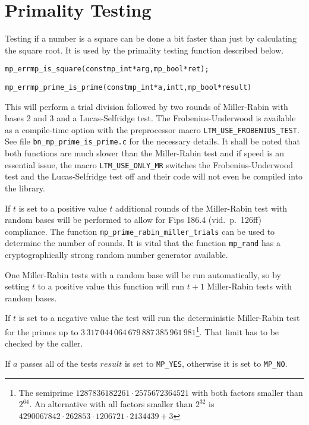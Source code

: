 \documentclass[synpaper]{book}
\begin{document}
\section{Primality Testing}
Testing if a number is a square can be done a bit faster than just by calculating the square root. It is used by the primality testing function described below.
\begin{alltt}
mp_err mp_is_square(const mp_int *arg, mp_bool *ret);
\end{alltt}


\begin{alltt}
mp_err mp_prime_is_prime(const mp_int *a, int t, mp_bool *result)
\end{alltt}
This will perform a trial division followed by two rounds of Miller-Rabin with bases 2 and 3 and a Lucas-Selfridge test. The Frobenius-Underwood is available as a compile-time option with the preprocessor macro \texttt{LTM\_USE\_FROBENIUS\_TEST}. See file
\texttt{bn\_mp\_prime\_is\_prime.c} for the necessary details. It shall be noted that both functions are much slower than
the Miller-Rabin test and if speed is an essential issue, the macro \texttt{LTM\_USE\_ONLY\_MR} switches the Frobenius-Underwood test and the Lucas-Selfridge test off and their code will not even be compiled into the library.

If $t$ is set to a positive value $t$ additional rounds of the Miller-Rabin test with random bases will be performed to allow for Fips 186.4 (vid.~p.~126ff) compliance. The function \texttt{mp\_prime\_rabin\_miller\_trials} can be used to determine the number of rounds. It is vital that the function \texttt{mp\_rand} has a cryptographically strong random number generator available.

One Miller-Rabin tests with a random base will be run automatically, so by setting $t$ to a positive value this function will run $t + 1$ Miller-Rabin tests with random bases.

If  $t$ is set to a negative value the test will run the deterministic Miller-Rabin test for the primes up to $3\,317\,044\,064\,679\,887\,385\,961\,981$\footnote{The semiprime $1287836182261\cdot 2575672364521$ with both factors smaller than $2^64$. An alternative with all factors smaller than $2^32$ is $4290067842\cdot 262853\cdot 1206721\cdot 2134439 + 3$}. That limit has to be checked by the caller.

If $a$ passes all of the tests $result$ is set to \texttt{MP\_YES}, otherwise it is set to \texttt{MP\_NO}.
\end{document}

